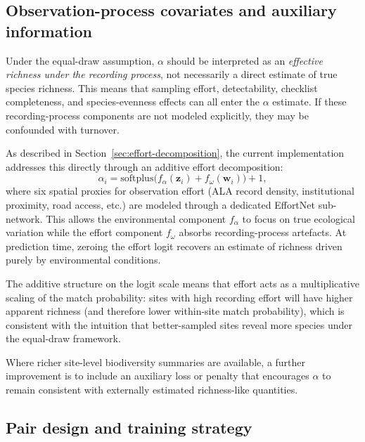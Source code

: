 \documentclass{article}
\begin{document}
\subsection{Observation-process covariates and auxiliary information}

Under the equal-draw assumption, \(\alpha\) should be interpreted as an \emph{effective richness under the recording process}, not necessarily a direct estimate of true species richness. This means that sampling effort, detectability, checklist completeness, and species-evenness effects can all enter the \(\alpha\) estimate. If these recording-process components are not modeled explicitly, they may be confounded with turnover.

As described in Section~\ref{sec:effort-decomposition}, the current implementation addresses this directly through an additive effort decomposition:
\begin{equation}
    \alpha_i = \text{softplus}\!\big(f_\alpha(\mathbf{z}_i) + f_\omega(\mathbf{w}_i)\big) + 1,
\end{equation}
where six spatial proxies for observation effort (ALA record density, institutional proximity, road access, etc.) are modeled through a dedicated EffortNet sub-network. This allows the environmental component $f_\alpha$ to focus on true ecological variation while the effort component $f_\omega$ absorbs recording-process artefacts. At prediction time, zeroing the effort logit recovers an estimate of richness driven purely by environmental conditions.

The additive structure on the logit scale means that effort acts as a multiplicative scaling of the match probability: sites with high recording effort will have higher apparent richness (and therefore lower within-site match probability), which is consistent with the intuition that better-sampled sites reveal more species under the equal-draw framework.

Where richer site-level biodiversity summaries are available, a further improvement is to include an auxiliary loss or penalty that encourages \(\alpha\) to remain consistent with externally estimated richness-like quantities.

\subsection{Pair design and training strategy}
\end{document}
